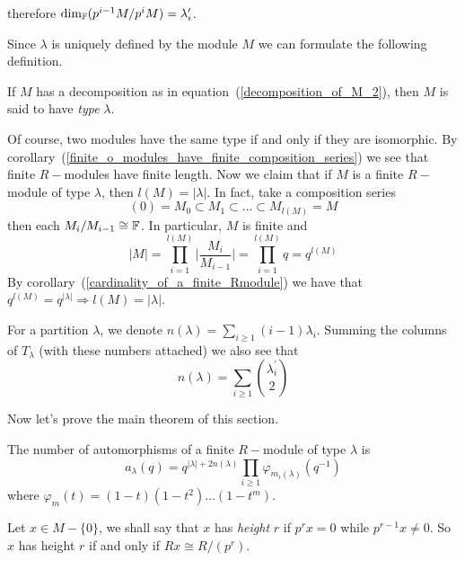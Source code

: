 therefore $\text{dim}_{\mathbb{F}}(p^{i-1}M/p^{i}M)=\lambda_i^\prime$.\par
Since $\lambda$ is uniquely defined by the module $M$ we can formulate the following definition.
\begin{dang}
    \begin{definition}
        If $M$ has a decomposition as in equation~(\ref{decomposition_of_M_2}), then $M$ is said to have \textit{type} $\lambda$.
    \end{definition}
\end{dang}
Of course, two modules have the same type if and only if they are isomorphic. By corollary~(\ref{finite_o_modules_have_finite_composition_series}) we see that finite $R-$modules have finite length. Now we claim that if $M$ is a finite $R-$module of type $\lambda$, then $l(M)=|\lambda|$. In fact, take a composition series
\begin{equation}
    (0)=M_0\subset M_1\subset \dots \subset M_{l(M)}=M
\end{equation}
then each $M_i/M_{i-1}\cong\mathbb{F}$. In particular, $M$ is finite and
\begin{equation}
    |M| =  \prod_{i=1}^{l(M)}\Bigg|\frac{M_i}{M_{i-1}}\Bigg| = \prod_{i=1}^{l(M)}q=q^{l(M)}
\end{equation}
By corollary~(\ref{cardinality_of_a_finite_Rmodule}) we have that $q^{l(M)}=q^{|\lambda|}\Rightarrow l(M)=|\lambda|$. 
\begin{dang}
    \begin{notation}\cite{macdonald1998symmetric}
        For a partition $\lambda$, we denote $n(\lambda)=\sum_{i\geq1}(i-1)\lambda_i$. Summing the columns of $T_\lambda$ (with these numbers attached) we also see that 
        \[
        n(\lambda)=\sum_{i\geq1}\binom{\lambda_i^\prime}{2}
        \]
    \end{notation}
\end{dang}
Now let's prove the main theorem of this section.
\begin{dang}
    \begin{theorem}\label{numbero_of_automorphisms_of_M_of_type_lambda}\cite{macdonald1998symmetric}
        The number of automorphisms of a finite $R-$module of type $\lambda$ is
        \begin{equation}
            a_\lambda(q)=q^{|\lambda|+2n(\lambda)}\prod_{i\geq1}\varphi_{m_i(\lambda)}(q^{-1})
        \end{equation}
        where $\varphi_m(t)=(1-t)(1-t^2)\dots(1-t^m)$.
    \end{theorem}
\end{dang}
\begin{dang}
    \begin{definition}\cite{macdonald1998symmetric}
        Let $x\in M-\{0\}$, we shall say that $x$ has \textit{height} $r$ if $p^rx=0$ while $p^{r-1}x\neq0$. So $x$ has height $r$ if and only if $Rx\cong R/(p^r)$.
    \end{definition}
\end{dang}

